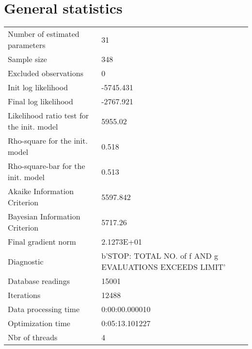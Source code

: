


\section{General statistics}
\begin{tabular}{ll}
Number of estimated parameters & 31 \\
Sample size & 348 \\
Excluded observations & 0 \\
Init log likelihood & -5745.431 \\
Final log likelihood & -2767.921 \\
Likelihood ratio test for the init. model & 5955.02 \\
Rho-square for the init. model & 0.518 \\
Rho-square-bar for the init. model & 0.513 \\
Akaike Information Criterion & 5597.842 \\
Bayesian Information Criterion & 5717.26 \\
Final gradient norm & 2.1273E+01 \\
Diagnostic & b'STOP: TOTAL NO. of f AND g EVALUATIONS EXCEEDS LIMIT' \\
Database readings & 15001 \\
Iterations & 12488 \\
Data processing time & 0:00:00.000010 \\
Optimization time & 0:05:13.101227 \\
Nbr of threads & 4 \\
\end{tabular}

